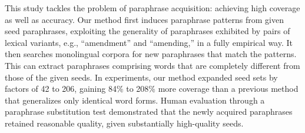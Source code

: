 This study tackles the problem of paraphrase acquisition: achieving high coverage as well as accuracy.  Our method first induces paraphrase patterns from given seed paraphrases, exploiting the generality of paraphrases exhibited by pairs of lexical variants, e.g., ``amendment'' and ``amending,'' in a fully empirical way.                          It then searches monolingual corpora for new paraphrases that match the patterns.  This can extract paraphrases comprising words that are completely different from those of the given seeds.  In experiments, our method expanded seed sets by factors of 42 to 206, gaining 84\% to 208\% more coverage than a previous method that generalizes only identical word forms.  Human evaluation through a paraphrase substitution test demonstrated that the newly acquired paraphrases retained reasonable quality, given substantially high-quality seeds.
